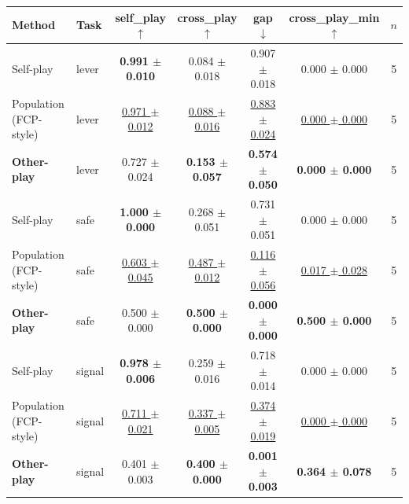 \begin{tabular}{llccccc}
\toprule
Method & Task & self\_play $\uparrow$ & cross\_play $\uparrow$ & gap $\downarrow$ & cross\_play\_min $\uparrow$ & $n$ \\
\midrule
Self-play & lever & \textbf{0.991 $\pm$ 0.010} & 0.084 $\pm$ 0.018 & 0.907 $\pm$ 0.018 & 0.000 $\pm$ 0.000 & 5 \\
Population (FCP-style) & lever & \underline{0.971 $\pm$ 0.012} & \underline{0.088 $\pm$ 0.016} & \underline{0.883 $\pm$ 0.024} & \underline{0.000 $\pm$ 0.000} & 5 \\
\textbf{Other-play} & lever & 0.727 $\pm$ 0.024 & \textbf{0.153 $\pm$ 0.057} & \textbf{0.574 $\pm$ 0.050} & \textbf{0.000 $\pm$ 0.000} & 5 \\
\midrule
Self-play & safe & \textbf{1.000 $\pm$ 0.000} & 0.268 $\pm$ 0.051 & 0.731 $\pm$ 0.051 & 0.000 $\pm$ 0.000 & 5 \\
Population (FCP-style) & safe & \underline{0.603 $\pm$ 0.045} & \underline{0.487 $\pm$ 0.012} & \underline{0.116 $\pm$ 0.056} & \underline{0.017 $\pm$ 0.028} & 5 \\
\textbf{Other-play} & safe & 0.500 $\pm$ 0.000 & \textbf{0.500 $\pm$ 0.000} & \textbf{0.000 $\pm$ 0.000} & \textbf{0.500 $\pm$ 0.000} & 5 \\
\midrule
Self-play & signal & \textbf{0.978 $\pm$ 0.006} & 0.259 $\pm$ 0.016 & 0.718 $\pm$ 0.014 & 0.000 $\pm$ 0.000 & 5 \\
Population (FCP-style) & signal & \underline{0.711 $\pm$ 0.021} & \underline{0.337 $\pm$ 0.005} & \underline{0.374 $\pm$ 0.019} & \underline{0.000 $\pm$ 0.000} & 5 \\
\textbf{Other-play} & signal & 0.401 $\pm$ 0.003 & \textbf{0.400 $\pm$ 0.000} & \textbf{0.001 $\pm$ 0.003} & \textbf{0.364 $\pm$ 0.078} & 5 \\
\bottomrule
\end{tabular}
